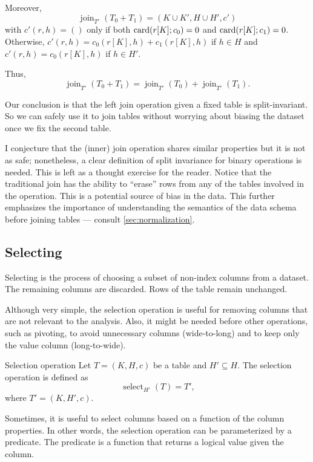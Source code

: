 Moreover, \[
  \operatorname{join}_{T'}(T_0 + T_1) = (K \cup K', H \cup H', c')
\] with $c'(r, h) = ()$ only if both $\rowcard[{r[K]; c_0}] = 0$ and $\rowcard[{r[K];
c_1}] = 0$.  Otherwise, $c'(r, h) = c_0(r[K], h) + c_1(r[K], h)$ if $h \in H$ and $c'(r,
h) = c_0(r[K], h)$ if $h \in H'$.

Thus, \[
  \operatorname{join}_{T'}(T_0 + T_1) = \operatorname{join}_{T'}(T_0) + \operatorname{join}_{T'}(T_1)\text{.}
\]

Our conclusion is that the left join operation given a fixed table is split-invariant.
So we can safely use it to join tables without worrying about biasing the dataset once we
fix the second table.

I conjecture that the (inner) join operation shares similar properties but it is not as
safe; nonetheless, a clear definition of split invariance for binary operations is needed.
This is left as a thought exercise for the reader.  Notice that the traditional join has
the ability to ``erase'' rows from any of the tables involved in the operation.  This is a
potential source of bias in the data.  This further emphasizes the importance of
understanding the semantics of the data schema before joining tables --- consult
\cref{sec:normalization}.

\subsection{Selecting}
\label{sub:selection}

Selecting is the process of choosing a subset of non-index columns from a dataset.  The
remaining columns are discarded.  Rows of the table remain unchanged.

Although very simple, the selection operation is useful for removing columns that are not
relevant to the analysis.  Also, it might be needed before other operations, such as
pivoting, to avoid unnecessary columns (wide-to-long) and to keep only the value column
(long-to-wide).

\begin{definition}{Selection operation}\label{def:selection}
  Let $T = (K, H, c)$ be a table and $H' \subseteq H$.  The selection operation is
  defined as \[
    \operatorname{select}_{H'}(T) = T'\text{,}
  \] where $T' = (K, H', c)$.
\end{definition}

Sometimes, it is useful to select columns based on a function of the column properties.
In other words, the selection operation can be parameterized by a predicate.  The predicate
is a function that returns a logical value given the column.

